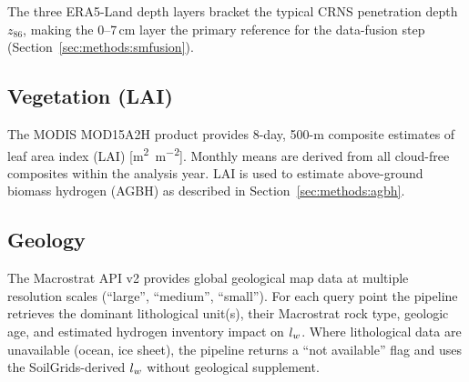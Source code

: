 The three ERA5-Land depth layers bracket the typical CRNS
penetration depth $z_{86}$, making the 0--7\,cm layer the primary
reference for the data-fusion step (Section~\ref{sec:methods:smfusion}).

\subsection{Vegetation (LAI)}

The MODIS MOD15A2H product provides 8-day, 500-m composite
estimates of leaf area index (LAI) [\si{\metre\squared\per\metre\squared}].
Monthly means are derived from all cloud-free composites within
the analysis year.
LAI is used to estimate above-ground biomass hydrogen (AGBH)
as described in Section~\ref{sec:methods:agbh}.

\subsection{Geology}

The Macrostrat API v2 provides global geological map data at
multiple resolution scales (``large'', ``medium'', ``small'').
For each query point the pipeline retrieves the dominant
lithological unit(s), their Macrostrat rock type, geologic age,
and estimated hydrogen inventory impact on $l_w$.
Where lithological data are unavailable (ocean, ice sheet), the
pipeline returns a ``not available'' flag and uses the
SoilGrids-derived $l_w$ without geological supplement.
